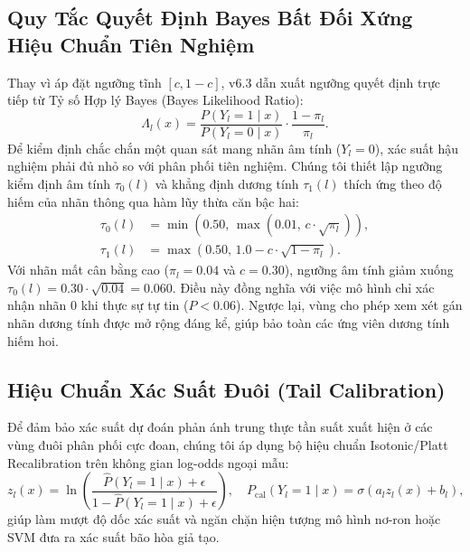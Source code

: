 \documentclass[10pt,a4paper,twoside]{article}
\begin{document}
\subsection{Quy Tắc Quyết Định Bayes Bất Đối Xứng Hiệu Chuẩn Tiên Nghiệm}
Thay vì áp đặt ngưỡng tĩnh $[c, 1-c]$, v6.3 dẫn xuất ngưỡng quyết định trực tiếp từ Tỷ số Hợp lý Bayes (Bayes Likelihood Ratio):
\begin{equation}
\Lambda_l(x) = \frac{P(Y_l = 1 \mid x)}{P(Y_l = 0 \mid x)} \cdot \frac{1 - \pi_l}{\pi_l}.
\end{equation}
Để kiểm định chắc chắn một quan sát mang nhãn âm tính ($Y_l = 0$), xác suất hậu nghiệm phải đủ nhỏ so với phân phối tiên nghiệm. Chúng tôi thiết lập ngưỡng kiểm định âm tính $\tau_0(l)$ và khẳng định dương tính $\tau_1(l)$ thích ứng theo độ hiếm của nhãn thông qua hàm lũy thừa căn bậc hai:
\begin{align}
\tau_0(l) &= \min\left(0.50, \, \max\left(0.01, \, c \cdot \sqrt{\pi_l}\right)\right), \label{eq:tau0} \\
\tau_1(l) &= \max\left(0.50, \, 1.0 - c \cdot \sqrt{1 - \pi_l}\right). \label{eq:tau1}
\end{align}
Với nhãn mất cân bằng cao ($\pi_l = 0.04$ và $c = 0.30$), ngưỡng âm tính giảm xuống $\tau_0(l) = 0.30 \cdot \sqrt{0.04} = 0.060$. Điều này đồng nghĩa với việc mô hình chỉ xác nhận nhãn $0$ khi thực sự tự tin ($P < 0.06$). Ngược lại, vùng cho phép xem xét gán nhãn dương tính được mở rộng đáng kể, giúp bảo toàn các ứng viên dương tính hiếm hoi.

\subsection{Hiệu Chuẩn Xác Suất Đuôi (Tail Calibration)}
Để đảm bảo xác suất dự đoán phản ánh trung thực tần suất xuất hiện ở các vùng đuôi phân phối cực đoan, chúng tôi áp dụng bộ hiệu chuẩn Isotonic/Platt Recalibration trên không gian log-odds ngoại mẫu:
\begin{equation}
z_l(x) = \ln \left( \frac{\hat{P}(Y_l=1 \mid x) + \epsilon}{1 - \hat{P}(Y_l=1 \mid x) + \epsilon} \right), \quad P_{\text{cal}}(Y_l=1 \mid x) = \sigma(a_l z_l(x) + b_l),
\end{equation}
giúp làm mượt độ dốc xác suất và ngăn chặn hiện tượng mô hình nơ-ron hoặc SVM đưa ra xác suất bão hòa giả tạo.
\end{document}

